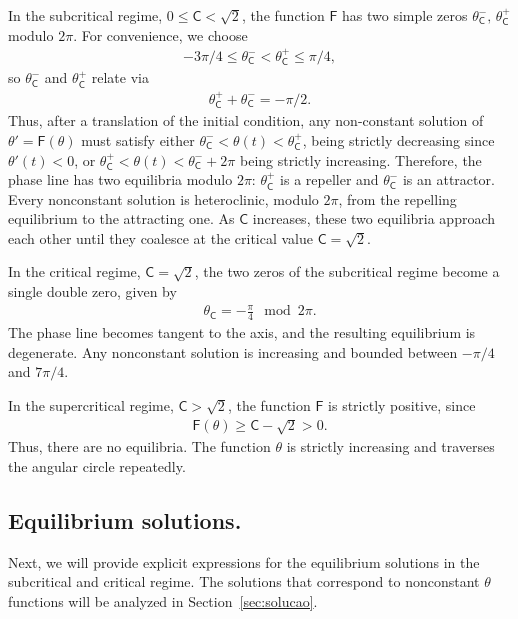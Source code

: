 \documentclass[11pt,a4paper]{amsart}
\theoremstyle{plain}
\theoremstyle{remark}
\newcommand{\C}{\mathsf{C}}
\newcommand{\F}{\mathsf{F}}
\begin{document}
In the subcritical regime, $0\le\C<\sqrt2$, the function $\F$ has 
two simple zeros $\theta_\C^-,\,\theta_\C^+$ modulo $2\pi$. 
For convenience, we choose
\begin{align*}
-3\pi/4\leq \theta_\C^-<\theta_\C^+\leq \pi/4,
\end{align*}
so $\theta_\C^-$ and $\theta_\C^+$ relate via
\begin{align}\label{eqrelatethc}
\theta_\C^++\theta_\C^- = -\pi/2.
\end{align}
Thus, after a translation of the initial condition, 
any non-constant solution of $\theta'=\F(\theta)$ must 
satisfy either $\theta_\C^- < \theta(t) < \theta_\C^+$, being
strictly decreasing since $\theta'(t)<0$, or
$\theta_\C^+<\theta(t) < \theta_\C^-+2\pi$ being strictly increasing.
Therefore, the phase line has two equilibria modulo $2\pi$:
$\theta_\C^+$ is a repeller and $\theta_\C^-$ is an attractor.
Every nonconstant solution is heteroclinic, modulo $2\pi$, from the
repelling equilibrium to the attracting one.
As $\C$ increases, these two equilibria
approach each other until they coalesce at the critical value $\C=\sqrt2$.




In the critical regime, $\C=\sqrt2$, the two zeros of the subcritical regime 
become a single double zero, given by
\begin{align*}
\theta_\C=-\frac\pi4 \mod 2\pi.
\end{align*}
The phase line becomes tangent to the axis, and the 
resulting equilibrium is 
degenerate. Any nonconstant solution is increasing and bounded 
between $-\pi/4$ and $7\pi/4$.

In the supercritical regime, $\C>\sqrt2$, the function $\F$ is strictly 
positive, since
\begin{align*}
\F(\theta)\ge \C-\sqrt2>0.
\end{align*}
Thus, there are no equilibria. 
The function $\theta$ is strictly increasing 
and traverses the angular circle repeatedly.


\subsection{Equilibrium solutions.} Next, we will provide explicit
expressions for the equilibrium solutions in the subcritical and critical 
regime. The solutions that correspond to nonconstant $\theta$ functions 
will be analyzed in Section~\ref{sec:solucao}.
\end{document}

